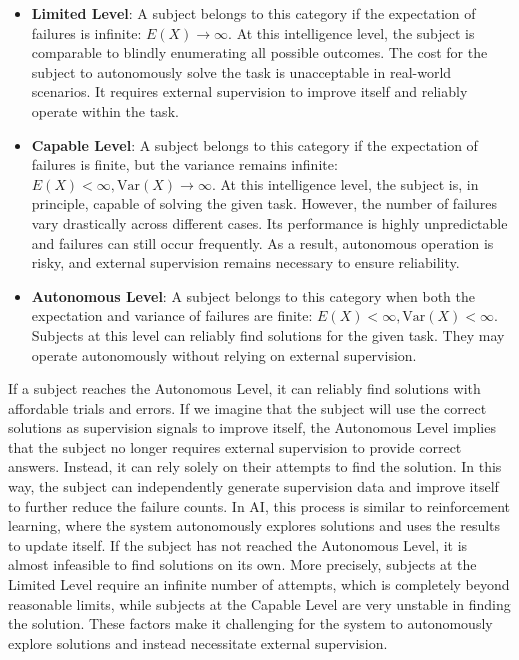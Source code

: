 \begin{itemize}
	\item \textbf{Limited Level}: A subject belongs to this category if the expectation of failures is infinite: \( E(X) \rightarrow \infty \). At this intelligence level, the subject is comparable to blindly enumerating all possible outcomes. The cost for the subject to autonomously solve the task is unacceptable in real-world scenarios. It requires external supervision to improve itself and reliably operate within the task.
	\item \textbf{Capable Level}: A subject belongs to this category if the expectation of failures is finite, but the variance remains infinite: \( E(X) < \infty , \text{Var}(X) \rightarrow \infty \). At this intelligence level, the subject is, in principle, capable of solving the given task. However, the number of failures vary drastically across different cases. Its performance is highly unpredictable and failures can still occur frequently. As a result, autonomous operation is risky, and external supervision remains necessary to ensure reliability.
	\item \textbf{Autonomous Level}: A subject belongs to this category when both the expectation and variance of failures are finite: \( E(X) < \infty , \text{Var}(X) < \infty \). Subjects at this level can reliably find solutions for the given task. They may operate autonomously without relying on external supervision.
\end{itemize}

If a subject reaches the Autonomous Level, it can reliably find solutions with affordable trials and errors. If we imagine that the subject will use the correct solutions as supervision signals to improve itself, the Autonomous Level implies that the subject no longer requires external supervision to provide correct answers. Instead, it can rely solely on their attempts to find the solution. In this way, the subject can independently generate supervision data and improve itself to further reduce the failure counts. In AI, this process is similar to reinforcement learning, where the system autonomously explores solutions and uses the results to update itself. If the subject has not reached the Autonomous Level, it is almost infeasible to find solutions on its own. More precisely, subjects at the Limited Level require an infinite number of attempts, which is completely beyond reasonable limits, while subjects at the Capable Level are very unstable in finding the solution. These factors make it challenging for the system to autonomously explore solutions and instead necessitate external supervision.

